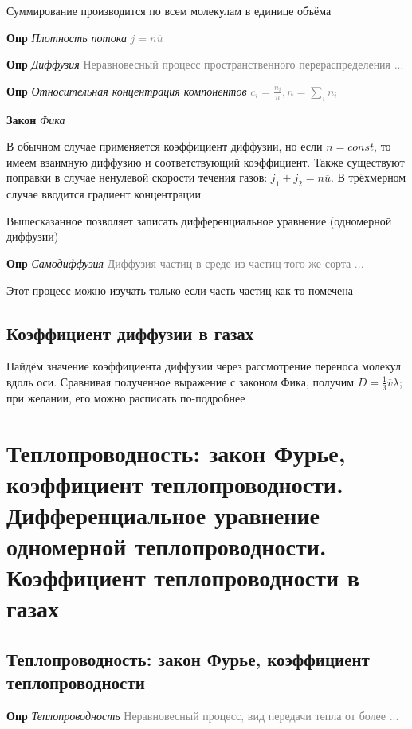 \documentclass[a4paper, 14pt]{article}
\begin{document}
    Суммирование производится по всем молекулам в единице объёма
    
    \textbf{Опр} \textit{Плотность потока} \textcolor{gray}{$\overline{j} = n\overline{u}$}
    
    \textbf{Опр} \textit{Диффузия} \textcolor{gray}{Неравновесный процесс пространственного перераспределения ...}
    
    \textbf{Опр} \textit{Относительная концентрация компонентов} \textcolor{gray}{$c_i = \frac{n_i}{n}, n = \sum_i n_i$}
    
    \textbf{Закон} \textit{Фика}
    
    В обычном случае применяется коэффициент диффузии, но если $n = const$, то имеем взаимную диффузию и
    соответствующий коэффициент.
    Также существуют поправки в случае ненулевой скорости течения газов: $j_1 + j_2 = n \overline{u}$.
    В трёхмерном случае вводится градиент концентрации
    
    Вышесказанное позволяет записать дифференциальное уравнение (одномерной диффузии)
    
    \textbf{Опр} \textit{Самодиффузия} \textcolor{gray}{Диффузия частиц в среде из частиц того же сорта ...}
    
    Этот процесс можно изучать только если часть частиц как-то помечена
    
    \subsection{Коэффициент диффузии в газах}
    
    Найдём значение коэффициента диффузии через рассмотрение переноса молекул вдоль оси.
    Сравнивая полученное выражение с законом Фика, получим $D = \frac{1}{3} \overline{v}\lambda$; при
    желании, его можно расписать по-подробнее
    
    \section{Теплопроводность: закон Фурье, коэффициент теплопроводности. Дифференциальное уравнение одномерной
    теплопроводности.
    Коэффициент теплопроводности в газах}
    
    \subsection{Теплопроводность: закон Фурье, коэффициент теплопроводности}
    
    \textbf{Опр} \textit{Теплопроводность} \textcolor{gray}{Неравновесный процесс, вид передачи тепла от более ...}
    
\end{document}
